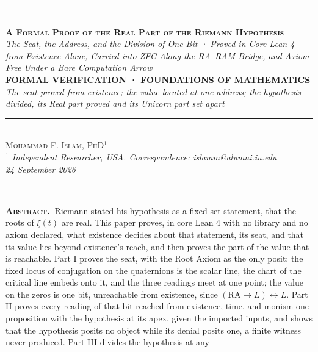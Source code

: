 \documentclass[10pt]{article}
\begin{document}
{%
\begin{center}
{\color{accent}\rule{0.6\textwidth}{0.8pt}}\\[10pt]
{\bfseries\scshape\fontsize{20}{23}\selectfont A Formal Proof of the
Real Part of the Riemann Hypothesis}\\[7pt]
{\itshape\large The Seat, the Address, and the Division of One Bit ·
Proved in Core Lean 4 from Existence Alone, Carried into ZFC Along the
RA--RAM Bridge, and Axiom-Free Under a Bare Computation Arrow}\\[8pt]
{\footnotesize\color{accent}\scshape\bfseries FORMAL VERIFICATION ·
FOUNDATIONS OF MATHEMATICS}\\[3pt]
{\itshape\color{deep}\small The seat proved from existence; the value
located at one address; the hypothesis divided, its Real part proved and
its Unicorn part set apart}\\[9pt]
{\color{accent}\rule{0.6\textwidth}{0.8pt}}\\[10pt]
{\scshape Mohammad F. Islam, PhD\(^{1}\)}\\[2pt]
{\itshape\color{faint}\small \(^{1}\) Independent Researcher, USA.
Correspondence: islamm@alumni.iu.edu}\\[2pt]
{\itshape\color{faint}\small 24 September 2026}\\[14pt]
\end{center}
\begin{minipage}{\textwidth}
{\color{accent}\rule{\textwidth}{0.6pt}}\\[4pt]
{\small\hspace{1em}\textbf{\scshape\color{deep}Abstract.\ }Riemann
stated his hypothesis as a fixed-set statement, that the roots of
\(\xi(t)\) are real. This paper proves, in core Lean 4 with no library
and no axiom declared, what existence decides about that statement, its
seat, and that its value lies beyond existence's reach, and then proves
the part of the value that is reachable. Part I proves the seat, with
the Root Axiom as the only posit: the fixed locus of conjugation on the
quaternions is the scalar line, the chart of the critical line embeds
onto it, and the three readings meet at one point; the value on the
zeros is one bit, unreachable from existence, since
\((\mathrm{RA} \to L) \leftrightarrow L\). Part II proves every reading
of that bit reached from existence, time, and monism one proposition
with the hypothesis at its apex, given the imported inputs, and shows
that the hypothesis posits no object while its denial posits one, a
finite witness never produced. Part III divides the hypothesis at any
}
\end{minipage}}
\end{document}
